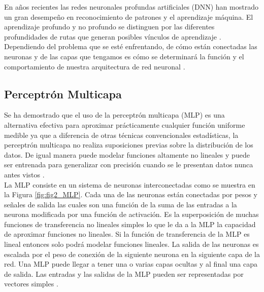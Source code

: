 \begin{onehalfspacing}
En años recientes las redes neuronales profundas artificiales (DNN) han mostrado un gran desempeño en reconocimiento de patrones y el aprendizaje máquina. El aprendizaje profundo y no profundo se distinguen por las diferentes profundidades de rutas que generan posibles vínculos de aprendizaje \cite{Schmidhuber2015DeepOverview}. Dependiendo del problema que se esté enfrentando, de cómo están conectadas las neuronas y de las capas que tengamos es cómo se determinará la función y el comportamiento de nuestra arquitectura de red neuronal \cite{Chernyatin1968NNDesign}.
\subsection{Perceptrón Multicapa}
\label{MLP}
Se ha demostrado que el uso de la perceptrón multicapa (MLP) es una alternativa efectiva para aproximar prácticamente cualquier función uniforme medible ya que a diferencia de otras técnicas convencionales estadísticas, la perceptrón multicapa no realiza suposiciones previas sobre la distribución de los datos. De igual manera puede modelar funciones altamente no lineales y puede ser entrenada para generalizar con precisión cuando se le presentan datos nunca antes vistos \cite{Gardner1998ArtificialSciences}.\\

La MLP consiste en un sistema de neuronas interconectadas como se muestra en la Figura \ref{fig:fig2_MLP}. Cada una de las neuronas están conectadas por pesos y señales de salida las cuales son una función de la suma de las entradas a la neurona modificada por una función de activación. Es la superposición de muchas funciones de transferencia no lineales simples lo que le da a la MLP la capacidad de aproximar funciones no lineales. Si la función de transferencia de la MLP es lineal entonces solo podrá modelar funciones lineales. La salida de las neuronas es escalada por el peso de conexión de la siguiente neurona en la siguiente capa de la red. Una MLP puede llegar a tener una o varias capas ocultas y al final una capa de salida. Las entradas y las salidas de la MLP pueden ser representadas por vectores simples \cite{Gardner1998ArtificialSciences}. \\


\end{onehalfspacing}
